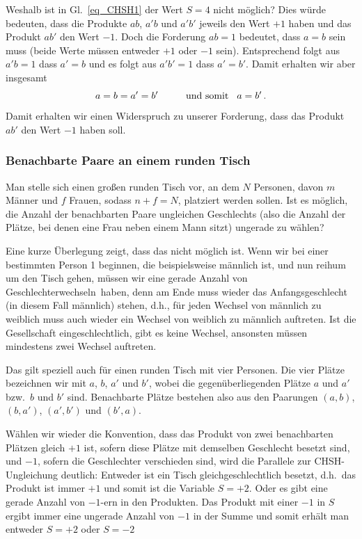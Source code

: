 Weshalb ist in Gl.\ \ref{eq_CHSH1} der Wert $S=4$ nicht m\"oglich? Dies w\"urde
bedeuten, dass die Produkte $ab$, $a'b$ und $a'b'$ jeweils den Wert $+1$ haben und
das Produkt $ab'$ den Wert $-1$. Doch die Forderung $ab=1$ bedeutet, dass $a=b$
sein muss (beide Werte m\"ussen entweder $+1$ oder $-1$ sein). Entsprechend folgt
aus $a'b=1$ dass $a'=b$ und es folgt aus $a'b'=1$ dass $a'=b'$. Damit erhalten wir
aber insgesamt
\begin{equation}
     a  = b =  a' = b'  \hspace{1cm} \mbox{und somit} \hspace{0.3cm}  a=b' \, .
\end{equation}  
Damit erhalten wir einen Widerspruch zu unserer Forderung, dass das Produkt $ab'$
den Wert $-1$ haben soll. 

\subsubsection{Benachbarte Paare an einem runden Tisch}

Man stelle sich einen gro\ss en runden Tisch vor, an dem $N$ Personen, davon
$m$ M\"anner und $f$ Frauen, sodass $n+f=N$, platziert werden sollen. Ist
es m\"oglich, die Anzahl der benachbarten Paare ungleichen Geschlechts (also
die Anzahl der Pl\"atze, bei denen eine Frau neben einem Mann sitzt) ungerade
zu w\"ahlen?

Eine kurze \"Uberlegung zeigt, dass das nicht m\"oglich ist. Wenn wir bei einer
bestimmten Person 1 beginnen, die beispielsweise m\"annlich ist, und nun reihum
um den Tisch gehen, m\"ussen wir eine gerade Anzahl von \glqq Geschlechterwechseln\grqq\
haben, denn am Ende muss wieder das Anfangsgeschlecht (in diesem Fall m\"annlich)
stehen, d.h., f\"ur jeden Wechsel von m\"annlich zu weiblich muss auch wieder ein
Wechsel von weiblich zu m\"annlich auftreten. Ist die Gesellschaft eingeschlechtlich, gibt
es keine Wechsel, ansonsten m\"ussen mindestens zwei Wechsel auftreten. 

Das gilt speziell auch f\"ur einen runden Tisch mit vier Personen. Die vier
Pl\"atze bezeichnen wir mit $a$, $b$, $a'$ und $b'$, wobei die gegen\"uberliegenden
Pl\"atze $a$ und $a'$ bzw.\ $b$ und $b'$ sind. Benachbarte Pl\"atze bestehen also
aus den Paarungen $(a,b)$, $(b,a')$, $(a',b')$ und $(b',a)$. 

W\"ahlen wir wieder die Konvention, dass das Produkt von zwei benachbarten
Pl\"atzen gleich $+1$ ist, sofern diese Pl\"atze mit demselben Geschlecht besetzt sind,
und $-1$, sofern die Geschlechter verschieden sind, wird die Parallele zur CHSH-Ungleichung
deutlich: Entweder ist ein Tisch gleichgeschlechtlich besetzt, d.h.\ das Produkt ist immer
$+1$ und somit ist die Variable $S=+2$. Oder es gibt eine gerade Anzahl von $-1$-ern in
den Produkten. Das Produkt mit einer $-1$ in $S$ ergibt immer eine ungerade Anzahl
von $-1$ in der Summe und somit erh\"alt man entweder $S=+2$ oder $S=-2$ 

